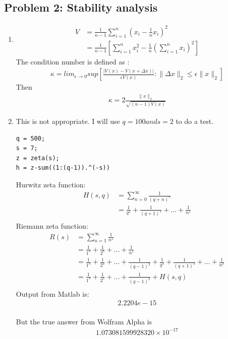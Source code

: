\documentclass{article}
\begin{document}
\hypertarget{}{}
\subsection*{{Problem 2: Stability analysis}}
\label{}
\begin{enumerate} 
\item 
\begin{align*} 
V &= \frac{1}{n-1}\sum_{i=1}^n(x_i-\frac{1}{n}x_i)^2 \\
& = \frac{1}{n-1}\left[\sum_{i=1}^nx_i^2 - \frac{1}{n}\left(\sum_{i=1}^nx_i\right)^2\right]
\end{align*}
The condition number is defined as : \\ 
\begin{align*} 
\kappa = lim_{\epsilon \to 0}sup\left[\frac{|V(x)-V(x+\Delta x)|}{\epsilon V(x)}: \|\Delta x\|_2 \leq \epsilon\|x\|_2\right]
\end{align*}  
Then \\ 
\begin{align*} 
\kappa = 2\frac{\|x\|_2}{\sqrt{(n-1)V(x)}}
\end{align*} 
\item 
This is not appropriate.  I will use $ q=100 and s =2 $ to do a test. 
\begin{lstlisting} 
q = 500; 
s = 7; 
z = zeta(s); 
h = z-sum((1:(q-1)).^(-s)) 
\end{lstlisting} 
Hurwitz zeta function: 
\begin{align*} H(s,q) &= \sum_{n=0}^\infty\frac{1}{(q+n)^s} \\
& = \frac{1}{q^s}+ \frac{1}{(q+1)^s} + ... +  \frac{1}{n^s}\\
\end{align*} 
Riemann zeta function: 
\begin{align*}
R(s) &= \sum_{n=1}^\infty\frac{1}{n^s}\\
& = \frac{1}{1^s} + \frac{1}{2^s} + ... + \frac{1}{n^s}\\
& = \frac{1}{1^s} + \frac{1}{2^s} + ... +\frac{1}{(q-1)^2} + \frac{1}{q^s}+ \frac{1}{(q+1)^s} + ... +  \frac{1}{n^s} \\
& = \frac{1}{1^s} + \frac{1}{2^s} + ... +\frac{1}{(q-1)^2} + H(s,q) \\
\end{align*} 
Output from Matlab is:  \begin{align*} 2.2204e-15 \end{align*} \\
But the true answer from Wolfram Alpha is \\\begin{align*} 1.073081599928320 \times 10^{-17} \end{align*}

\end{enumerate}
\end{document}
